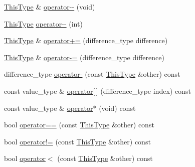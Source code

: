 \begin{DoxyCompactItemize}
\item 
\hyperlink{classvct_var_stride_n_array_const_iterator_ac729d2af265785aad6fdd43a70fbffdb}{This\+Type} \& \hyperlink{classvct_var_stride_n_array_const_iterator_aa82576a4daaae22d26b309dbc5e67d76}{operator-\/-\/} (void)
\item 
\hyperlink{classvct_var_stride_n_array_const_iterator_ac729d2af265785aad6fdd43a70fbffdb}{This\+Type} \hyperlink{classvct_var_stride_n_array_const_iterator_adb96c05b71bd85e13a0e8b7353a3567d}{operator-\/-\/} (int)
\item 
\hyperlink{classvct_var_stride_n_array_const_iterator_ac729d2af265785aad6fdd43a70fbffdb}{This\+Type} \& \hyperlink{classvct_var_stride_n_array_const_iterator_a4f205caf9e49786b984b4af918a11bce}{operator+=} (difference\+\_\+type difference)
\item 
\hyperlink{classvct_var_stride_n_array_const_iterator_ac729d2af265785aad6fdd43a70fbffdb}{This\+Type} \& \hyperlink{classvct_var_stride_n_array_const_iterator_a6818102765288c7d50027920a7471fa6}{operator-\/=} (difference\+\_\+type difference)
\item 
difference\+\_\+type \hyperlink{classvct_var_stride_n_array_const_iterator_a3136b61f02669a9fdf7187d94362bd1c}{operator-\/} (const \hyperlink{classvct_var_stride_n_array_const_iterator_ac729d2af265785aad6fdd43a70fbffdb}{This\+Type} \&other) const 
\item 
const value\+\_\+type \& \hyperlink{classvct_var_stride_n_array_const_iterator_aa87558431fe833c47b60c7a79fffabf0}{operator\mbox{[}$\,$\mbox{]}} (difference\+\_\+type index) const 
\item 
const value\+\_\+type \& \hyperlink{classvct_var_stride_n_array_const_iterator_aeee8ae1d7d4b697df11fb1bacfa03e09}{operator$\ast$} (void) const 
\item 
bool \hyperlink{classvct_var_stride_n_array_const_iterator_a489454a07a3dc7799a1bb785002ab24c}{operator==} (const \hyperlink{classvct_var_stride_n_array_const_iterator_ac729d2af265785aad6fdd43a70fbffdb}{This\+Type} \&other) const 
\item 
bool \hyperlink{classvct_var_stride_n_array_const_iterator_afeb1c9055eacc840d6fe8162f2f3ec9b}{operator!=} (const \hyperlink{classvct_var_stride_n_array_const_iterator_ac729d2af265785aad6fdd43a70fbffdb}{This\+Type} \&other) const 
\item 
bool \hyperlink{classvct_var_stride_n_array_const_iterator_ad1288a572b3b3ef669e8a76f750d0ea8}{operator$<$} (const \hyperlink{classvct_var_stride_n_array_const_iterator_ac729d2af265785aad6fdd43a70fbffdb}{This\+Type} \&other) const 

\end{DoxyCompactItemize}

